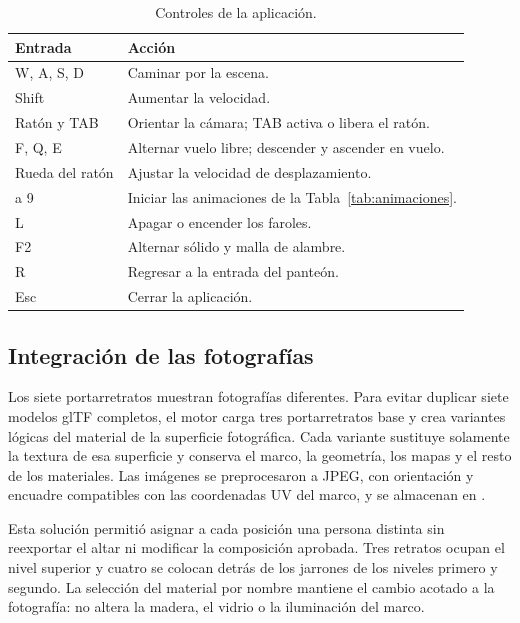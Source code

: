 \documentclass[letter,12pt]{article}
\begin{document}
	\begin{table}[H]
		\centering
		\small
		\begin{tabular}{>{\centering\arraybackslash}p{3.8cm}p{9cm}}
			\toprule
			\textbf{Entrada} & \textbf{Acción}\\
			\midrule
			W, A, S, D & Caminar por la escena. \\
			Shift & Aumentar la velocidad. \\
			Ratón y TAB & Orientar la cámara; TAB activa o libera el ratón. \\
			F, Q, E & Alternar vuelo libre; descender y ascender en vuelo. \\
			Rueda del ratón & Ajustar la velocidad de desplazamiento. \\
			1 a 9 & Iniciar las animaciones de la Tabla~\ref{tab:animaciones}. \\
			L & Apagar o encender los faroles. \\
			F2 & Alternar sólido y malla de alambre. \\
			R & Regresar a la entrada del panteón. \\
			Esc & Cerrar la aplicación. \\
			\bottomrule
		\end{tabular}
		\caption{Controles de la aplicación.}
		\label{tab:controles}
	\end{table}

	\subsection{Integración de las fotografías}
	Los siete portarretratos muestran fotografías diferentes. Para evitar duplicar siete modelos glTF completos, el motor carga tres portarretratos base y crea variantes lógicas del material de la superficie fotográfica. Cada variante sustituye solamente la textura de esa superficie y conserva el marco, la geometría, los mapas y el resto de los materiales. Las imágenes se preprocesaron a JPEG, con orientación y encuadre compatibles con las coordenadas UV del marco, y se almacenan en .

	Esta solución permitió asignar a cada posición una persona distinta sin reexportar el altar ni modificar la composición aprobada. Tres retratos ocupan el nivel superior y cuatro se colocan detrás de los jarrones de los niveles primero y segundo. La selección del material por nombre mantiene el cambio acotado a la fotografía: no altera la madera, el vidrio o la iluminación del marco.
\end{document}
